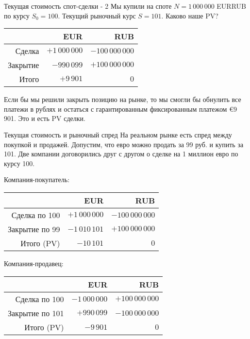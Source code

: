 \documentclass{beamer}
\renewcommand{\EUR}[1]{\textup{\euro}#1}
\begin{document}
\begin{frame}{Текущая стоимость спот-сделки - 2}
\justify
Мы купили на споте $N=1\,000\,000$ EURRUB по курсу $S_0 = 100$. Текущий рыночный курс $S=101$. Каково наше PV?

\justify
\centering
\begin{tabular}{r|r|r}
         & EUR               & RUB \\ \hline
Сделка   & $+1\,000\,000$ & $-100\,000\,000$ \\
Закрытие &    $-990\,099$ & $+100\,000\,000$ \\ \hline
Итого    &      $+9\,901$ & $0$
\end{tabular}

\justify
Если бы мы решили закрыть позицию на рынке, то мы смогли бы обнулить все платежи в рублях и остаться с гарантированным фиксированным платежом \EUR{9\,901}. Это и есть PV сделки.
\end{frame}



\begin{frame}{Текущая стоимость и рыночный спред}
\justify
На реальном рынке есть спред между покупкой и продажей. Допустим, что евро можно продать за 99 руб. и купить за 101. Две компании договорились друг с другом о сделке на 1 миллион евро по курсу 100.

\justify
Компания-покупатель:

\centering
\begin{tabular}{r|r|r}
                & EUR                   & RUB \\ \hline
Сделка по 100   & $+1\,000\,000$ & $-100\,000\,000$ \\
Закрытие по 99 & $-1\,010\,101$ & $+100\,000\,000$ \\ \hline
Итого (PV)      &      $-10\,101$ & $0$
\end{tabular}

\justify
Компания-продавец:

\centering
\begin{tabular}{r|r|r}
                 & EUR                   & RUB \\ \hline
Сделка по 100     & $-1\,000\,000$ & $+100\,000\,000$ \\
Закрытие по 101   &    $+990\,099$ & $-100\,000\,000$ \\ \hline
Итого (PV)       &      $-9\,901$ & $0$
\end{tabular} 
\end{frame}
\end{document}
